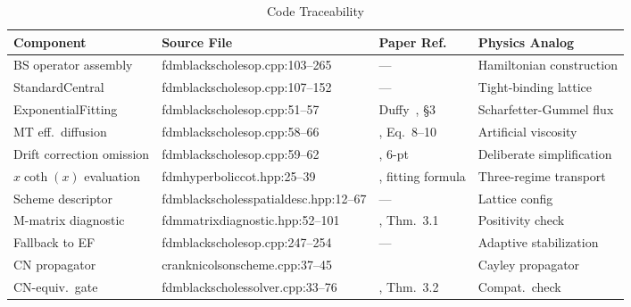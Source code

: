 \begin{table}[!t]
\centering
\caption{Code Traceability}
\label{tab:traceability}
\footnotesize
\begin{tabular}{>{\raggedright\arraybackslash}p{3.4cm}>{\raggedright\arraybackslash\ttfamily\scriptsize}p{4.4cm}>{\raggedright\arraybackslash}p{3.2cm}>{\raggedright\arraybackslash}p{3.2cm}}
\toprule
\textbf{Component} & \textbf{Source File} & \textbf{Paper Ref.} & \textbf{Physics Analog} \\
\midrule
\rmfamily BS operator assembly        & fdmblackscholesop.cpp:103--265        & ---                                  & \rmfamily Hamiltonian construction \\
\rmfamily StandardCentral             & fdmblackscholesop.cpp:107--152        & ---                                  & \rmfamily Tight-binding lattice \\
\rmfamily ExponentialFitting          & fdmblackscholesop.cpp:51--57          & \rmfamily Duffy~\cite{Duffy2004}, \S3          & \rmfamily Scharfetter-Gummel flux \\
\rmfamily MT eff.\ diffusion          & fdmblackscholesop.cpp:58--66          & \rmfamily\cite{MilevTagliani2010a}, Eq.~8--10 & \rmfamily Artificial viscosity \\
\rmfamily Drift correction omission   & fdmblackscholesop.cpp:59--62          & \rmfamily\cite{MilevTagliani2010a}, 6-pt      & \rmfamily Deliberate simplification \\
\rmfamily $x\coth(x)$ evaluation      & fdmhyperboliccot.hpp:25--39           & \rmfamily\cite{Duffy2004}, fitting formula    & \rmfamily Three-regime transport \\
\rmfamily Scheme descriptor           & fdmblackscholesspatialdesc.hpp:12--67  & ---                                  & \rmfamily Lattice config \\
\rmfamily M-matrix diagnostic         & fdmmatrixdiagnostic.hpp:52--101        & \rmfamily\cite{MilevTagliani2010a}, Thm.~3.1  & \rmfamily Positivity check \\
\rmfamily Fallback to EF              & fdmblackscholesop.cpp:247--254        & ---                                  & \rmfamily Adaptive stabilization \\
\rmfamily CN propagator               & cranknicolsonscheme.cpp:37--45         & \rmfamily\cite{MilevTagliani2010a,Duffy2004}  & \rmfamily Cayley propagator \\
\rmfamily CN-equiv.\ gate             & fdmblackscholessolver.cpp:33--76       & \rmfamily\cite{MilevTagliani2010a}, Thm.~3.2  & \rmfamily Compat.\ check \\

\end{tabular}
\end{table}
